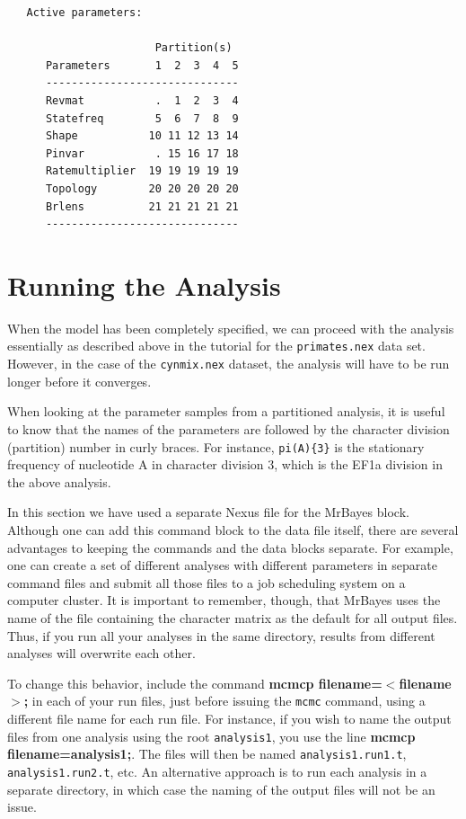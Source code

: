\documentclass[12pt]{book}
\begin{document}
\begin{singlespacing}
\small
\begin{verbatim}
   Active parameters:
 
                       Partition(s)
      Parameters       1  2  3  4  5
      ------------------------------
      Revmat           .  1  2  3  4
      Statefreq        5  6  7  8  9
      Shape           10 11 12 13 14
      Pinvar           . 15 16 17 18
      Ratemultiplier  19 19 19 19 19
      Topology        20 20 20 20 20
      Brlens          21 21 21 21 21
      ------------------------------
\end{verbatim}
\normalsize
\end{singlespacing}

\section{Running the Analysis}

When the model has been completely specified, we can proceed with the analysis essentially as described 
above in the tutorial for the \texttt{primates.nex} data set. However, in the case of the 
\texttt{cynmix.nex} dataset, the analysis will have to be run longer before it converges.

When looking at the parameter samples from a partitioned analysis, it is useful to know that the names of 
the parameters are followed by the character division (partition) number in curly braces. For instance, 
\texttt{pi(A)\{3\}} is the stationary frequency of nucleotide A in character division 3, which is the EF1a 
division in the above analysis.

In this section we have used a separate Nexus file for the MrBayes block. Although one can add this command 
block to the data file itself, there are several advantages to keeping the commands and the data blocks 
separate. For example, one can create a set of different analyses with different parameters in separate 
command files and submit all those files to a job scheduling system on a computer cluster. It is important 
to remember, though, that MrBayes uses the name of the file containing the character matrix as the default 
for all output files. Thus, if you run all your analyses in the same directory, results from different 
analyses will overwrite each other.

To change this behavior, include the command \textbf{mcmcp filename=$<$filename$>$;} in each of your run 
files, just before issuing the \texttt{mcmc} command, using a different file name for each run file. For 
instance, if you wish to name the output files from one analysis using the root \texttt{analysis1}, you use 
the line \textbf{mcmcp filename=analysis1;}. The files will then be named \texttt{analysis1.run1.t}, 
\texttt{analysis1.run2.t}, etc. An alternative approach is to run each analysis in a separate directory, in 
which case the naming of the output files will not be an issue.
\end{document}
